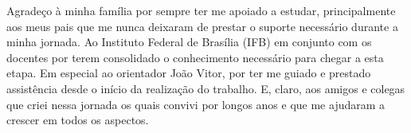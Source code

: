 Agradeço à minha família por sempre ter me apoiado a estudar, principalmente aos meus pais que me nunca deixaram de prestar o suporte necessário durante a minha jornada. Ao Instituto Federal de Brasília (IFB) em conjunto com os docentes por terem consolidado o conhecimento necessário para chegar a esta etapa. Em especial ao orientador João Vitor, por ter me guiado e prestado assistência desde o início da realização do trabalho. E, claro, aos amigos e colegas que criei nessa jornada os quais convivi por longos anos e que me ajudaram a crescer em todos os aspectos. 